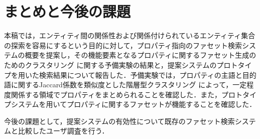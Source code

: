 \section{まとめと今後の課題}
本稿では，エンティティ間の関係性および関係付けられているエンティティ集合の探索を容易にするという目的に対して，プロパティ指向のファセット検索システムの概要を提案し，その機能要素となるプロパティに関するファセット生成のためのクラスタリング に関する予備実験の結果と，提案システムのプロトタイプを用いた検索結果について報告した．予備実験では，プロパティの主語と目的語に関するJaccard係数を類似度とした階層型クラスタリング によって，一定程度関係する領域でプロパティをまとめられることを確認した．また，プロトタイプシステムを用いてプロパティに関するファセットが機能することを確認した．

今後の課題として，提案システムの有効性について既存のファセット検索システムと比較したユーザ調査を行う．